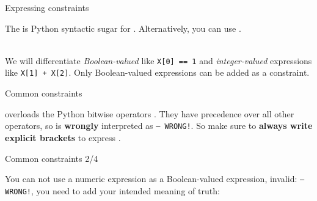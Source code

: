 \documentclass{cons-beamer}
\begin{document}
\begin{flashcardcpmpy}
\begin{frame}{Expressing constraints}
  

  The  is Python syntactic sugar for .
Alternatively, you can use .

  $ $\\
  We will differentiate \emph{Boolean-valued}  like \lstinline[language=cpmpy]{X[0] == 1} and \textit{integer-valued} expressions like \lstinline[language=cpmpy]{X[1] + X[2]}. Only Boolean-valued expressions can be added as a constraint.

\end{frame}

\begin{frame}{Common constraints}
  \begin{example}
    \vspace{-0.5em}
    
    \vspace{-0.5em}
  \end{example}
  \CPMpy overloads the Python bitwise operators \cpminline{&, |, ~}. They have precedence over all other operators, so  is \textbf{wrongly} interpreted as  \texttt{-- WRONG!}. So make sure to \textbf{always write explicit brackets} to express .
  \begin{example}
    \vspace{-0.5em}
    
    \vspace{-0.5em}
  \end{example}
\end{frame}

\begin{frame}{Common constraints 2/4}
  \begin{example}
    \vspace{-0.5em}
    
    \vspace{-0.5em}
  \end{example}
  You can not use a numeric expression as a Boolean-valued expression, \eg invalid:  \texttt{-- WRONG!}, you need to add your intended meaning of truth: 
\end{frame}


\end{flashcardcpmpy}
\end{document}

